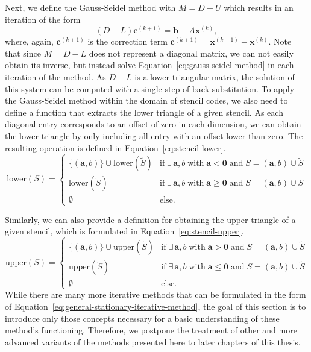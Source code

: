 Next, we define the Gauss-Seidel method with $M = D - U$ which results in an iteration of the form
\begin{equation}
	(D - L) \bm{c}^{(k+1)} = \bm{b} - A \bm{x}^{(k)}, 
	\label{eq:gauss-seidel-method}
\end{equation}
where, again, $\bm{c}^{(k+1)}$ is the correction term $\bm{c}^{(k+1)} = \bm{x}^{(k+1)} - \bm{x}^{(k)}$.
Note that since $M = D - L$ does not represent a diagonal matrix, we can not easily obtain its inverse, but instead solve Equation~\eqref{eq:gauss-seidel-method} in each iteration of the method.
As $D - L$ is a lower triangular matrix, the solution of this system can be computed with a single step of back substitution. 
To apply the Gauss-Seidel method within the domain of stencil codes, we also need to define a function that extracts the lower triangle of a given stencil.
As each diagonal entry corresponds to an offset of zero in each dimension, we can obtain the lower triangle by only including all entry with an offset lower than zero.
The resulting operation is defined in Equation~\eqref{eq:stencil-lower}.
\begin{equation}
	\text{lower}(S) = \begin{cases}
		\{(\bm{a}, b) \} \cup \text{lower}(\tilde{S}) & \text{if} \; \exists\, \bm a, b \; \text{with} \; \bm a < \bm 0 \; \text{and} \; S = (\bm a, b) \cup \tilde{S} \\
		\text{lower}(\tilde{S}) & \text{if} \; \exists\, \bm a, b \; \text{with} \; \bm a \geq \bm 0 \; \text{and} \; S = (\bm a, b) \cup \tilde{S} \\
		\emptyset & \text{else}.
	\end{cases}
	\label{eq:stencil-lower}
\end{equation}

Similarly, we can also provide a definition for obtaining the upper triangle of a given stencil, which is formulated in Equation~\eqref{eq:stencil-upper}.
\begin{equation}
	\text{upper}(S) = \begin{cases}
		\{(\bm{a}, b) \} \cup \text{upper}(\tilde{S}) & \text{if} \; \exists\, \bm a, b \; \text{with} \; \bm a > \bm 0 \; \text{and} \; S = (\bm a, b) \cup \tilde{S} \\
		\text{upper}(\tilde{S}) & \text{if} \; \exists\, \bm a, b \; \text{with} \; \bm a \leq \bm 0 \; \text{and} \; S = (\bm a, b) \cup \tilde{S} \\
		\emptyset & \text{else}.
	\end{cases}
	\label{eq:stencil-upper}
\end{equation}
While there are many more iterative methods that can be formulated in the form of Equation~\eqref{eq:general-stationary-iterative-method}, the goal of this section is to introduce only those concepts necessary for a basic understanding of these method's functioning.
Therefore, we postpone the treatment of other and more advanced variants of the methods presented here to later chapters of this thesis. 

